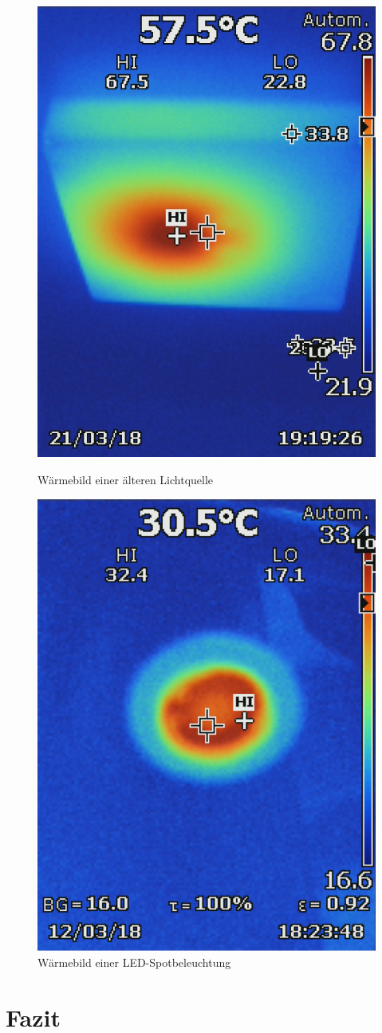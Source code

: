 \begin{figure}[!ht]
	\centering
	\begin{minipage}[b]{0.49\linewidth}
	\centering
	\includegraphics[width=0.5\linewidth]{fig/Lichtquellen.jpg}
	\caption{Wärmebild einer älteren Lichtquelle}
	\label{fig:lichtquellen}
	\end{minipage}
	\hfill
	\begin{minipage}[b]{0.49\linewidth}
	\centering
	\includegraphics[width=0.5\linewidth]{fig/Lichtquelle.png}
	\caption{Wärmebild einer LED-Spotbeleuchtung}
	\label{fig:m2lichtquelle}
	\end{minipage}
\end{figure}



\section{Fazit}

